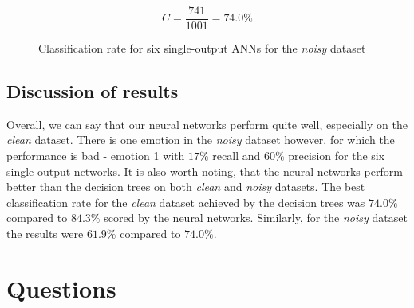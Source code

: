 \documentclass[a4paper]{article}
\begin{document}
\begin{figure}[H]
\[ C = \frac{741}{1001} = 74.0\% \]
\caption{Classification rate for six single-output ANNs for the \emph{noisy} dataset}
\end{figure}

\clearpage
\subsection{Discussion of results}
Overall, we can say that our neural networks perform quite well, especially on the \emph{clean} dataset. There is one emotion in the \emph{noisy} dataset however, for which the performance is bad - emotion 1 with $17\%$ recall and $60\%$ precision for the six single-output networks. It is also worth noting, that the neural networks perform better than the decision trees on both \emph{clean} and \emph{noisy} datasets. The best classification rate for the \emph{clean} dataset achieved by the decision trees was $74.0\%$ compared to $84.3\%$ scored by the neural networks. Similarly, for the \emph{noisy} dataset the results were $61.9\%$ compared to $74.0\%$.

\clearpage


\section{Questions}
\end{document}
